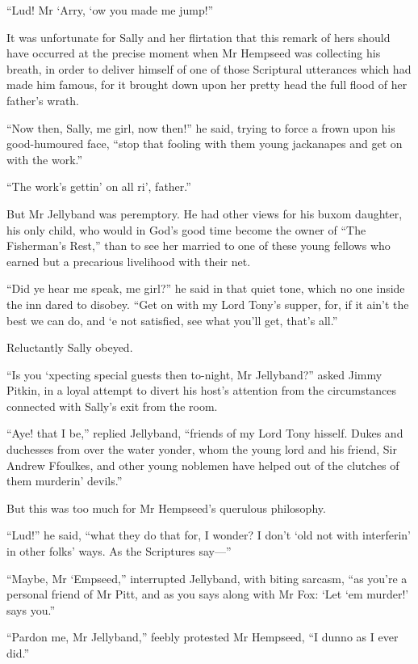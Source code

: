 \enquote{Lud! Mr `Arry, `ow you made me jump!}

It was unfortunate for Sally and her flirtation that this remark of hers should have occurred at the precise moment when Mr Hempseed was collecting his breath, in order to deliver himself of one of those Scriptural utterances which had made him famous, for it brought down upon her pretty head the full flood of her father's wrath.

\enquote{Now then, Sally, me girl, now then!} he said, trying to force a frown upon his good-humoured face, \enquote{stop that fooling with them young jackanapes and get on with the work.}

\enquote{The work's gettin’ on all ri’, father.}

But Mr Jellyband was peremptory. He had other views for his buxom daughter, his only child, who would in God's good time become the owner of \enquote{The Fisherman's Rest,} than to see her married to one of these young fellows who earned but a precarious livelihood with their net.

\enquote{Did ye hear me speak, me girl?} he said in that quiet tone, which no one inside the inn dared to disobey. \enquote{Get on with my Lord Tony's supper, for, if it ain't the best we can do, and `e not satisfied, see what you'll get, that's all.}

Reluctantly Sally obeyed.

\enquote{Is you `xpecting special guests then to-night, Mr Jellyband?} asked Jimmy Pitkin, in a loyal attempt to divert his host's attention from the circumstances connected with Sally's exit from the room.

\enquote{Aye! that I be,} replied Jellyband, \enquote{friends of my Lord Tony hisself. Dukes and duchesses from over the water yonder, whom the young lord and his friend, Sir Andrew Ffoulkes, and other young noblemen have helped out of the clutches of them murderin’ devils.}

But this was too much for Mr Hempseed's querulous philosophy.

\enquote{Lud!} he said, \enquote{what they do that for, I wonder? I don't `old not with interferin’ in other folks’ ways. As the Scriptures say---}

\enquote{Maybe, Mr `Empseed,} interrupted Jellyband, with biting sarcasm, \enquote{as you're a personal friend of Mr Pitt, and as you says along with Mr Fox: \enquote{Let `em murder!} says you.}

\enquote{Pardon me, Mr Jellyband,} feebly protested Mr Hempseed, \enquote{I dunno as I ever did.}

